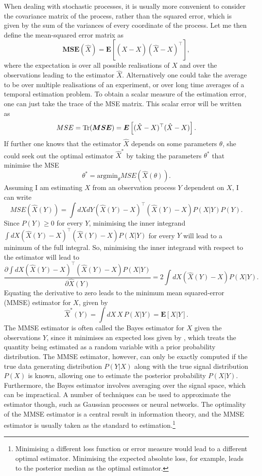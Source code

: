 When dealing with stochastic processes, it is usually more convenient to consider the covariance matrix of the process, rather than the squared error, which is given by the
sum of the variances of every coordinate of the process.
Let me then define the mean-squared error matrix as
\[
\boldsymbol{MSE}(\hat{X}) = \boldsymbol{E}\left[ (\hat{X} - X) (\hat{X}-X)^\top\right],
\]
where the expectation is over all possible realisations of $X$ and over the observations leading to the estimator $\hat{X}$. Alternatively one could take the average to be over
multiple realisations of an experiment, or over long time averages of a temporal estimation problem.
To obtain a scalar measure of the estimation error, one can just take the trace of the MSE matrix.
This scalar error will be written as 
\[
MSE = \operatorname{Tr}( \boldsymbol{MSE}) = \boldsymbol{E}\left[ (\hat{X} - X)^\top (\hat{X}-X)\right].
\]
If further one knows that the estimator $\hat{X}$ depends on some 
parameters $\theta$, she could seek out the optimal estimator $\hat{X}^*$ by taking the parameters $\theta^*$ that minimise the MSE
\[
\theta^* = \textrm{argmin}_\theta MSE( \hat{X}(\theta)  ).
\]
Assuming I am estimating $X$ from an observation process $Y$ dependent on $X$, I can write
\begin{equation}
\label{eq:bayes_mse}
MSE( \hat{X}(Y) ) = \int dX dY  (\hat{X}(Y) - X)^\top (\hat{X}(Y)-X) P(X|Y)P(Y).
\end{equation}
Since $P(Y)\ge 0$ for every $Y$, minimising the inner integrand $\int dX (\hat{X}(Y) - X)^\top (\hat{X}(Y)-X) P(X|Y)$ for every $Y$ will lead to a minimum of the full integral. So, minimising the inner integrand with respect to the estimator will lead to
\[
\frac{\partial \int dX (\hat{X}(Y) - X)^\top (\hat{X}(Y)-X) P(X|Y)}{\partial \hat{X}(Y)} = 2 \int dX (\hat{X}(Y) - X) P(X|Y).
\]
Equating the derivative to zero leads to the minimum mean squared-error (MMSE) estimator for $X$, given by
\[
\hat{X}^*(Y) = \int dX\, X\, P(X|Y) = \boldsymbol{E}[X|Y].
\]
The MMSE estimator is often called the Bayes estimator for $X$ given the observations $Y$, since it minimises an expected loss given by , which treats
the quantity being estimated as a random variable with a prior probability distribution.
The MMSE estimator, however, can only be exactly computed if the true data generating distribution $P(Y|X)$ along with the true signal distribution $P(X)$ is known, allowing one
to estimate the posterior probability $P(X|Y)$. Furthermore, the Bayes 
estimator involves averaging over the signal space, which can be impractical. A number of techniques can be used to approximate the estimator though, such as Gaussian
processes or neural networks. The optimality of the MMSE estimator is a central result in information theory, and the MMSE estimator is usually taken as the standard to 
estimation.\footnote{Minimising a different loss function or error measure would lead to a different optimal estimator. Minimising the expected absolute loss, for example, 
leads to the posterior median as the optimal estimator.}
\par

